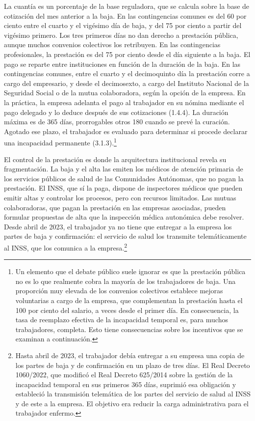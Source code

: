 \documentclass[10pt,a4paper]{article}
\begin{document}
La cuantía es un porcentaje de la base reguladora, que se calcula sobre la base de cotización del mes anterior a la baja. En las contingencias comunes es del 60 por ciento entre el cuarto y el vigésimo día de baja, y del 75 por ciento a partir del vigésimo primero. Los tres primeros días no dan derecho a prestación pública, aunque muchos convenios colectivos los retribuyen. En las contingencias profesionales, la prestación es del 75 por ciento desde el día siguiente a la baja. El pago se reparte entre instituciones en función de la duración de la baja. En las contingencias comunes, entre el cuarto y el decimoquinto día la prestación corre a cargo del empresario, y desde el decimosexto, a cargo del Instituto Nacional de la Seguridad Social o de la mutua colaboradora, según la opción de la empresa. En la práctica, la empresa adelanta el pago al trabajador en su nómina mediante el pago delegado y lo deduce después de sus cotizaciones (1.4.4). La duración máxima es de 365 días, prorrogables otros 180 cuando se prevé la curación. Agotado ese plazo, el trabajador es evaluado para determinar si procede declarar una incapacidad permanente (3.1.3).\footnote{Un elemento que el debate público suele ignorar es que la prestación pública no es lo que realmente cobra la mayoría de los trabajadores de baja. Una proporción muy elevada de los convenios colectivos establece mejoras voluntarias a cargo de la empresa, que complementan la prestación hasta el 100 por ciento del salario, a veces desde el primer día. En consecuencia, la tasa de reemplazo efectiva de la incapacidad temporal es, para muchos trabajadores, completa. Esto tiene consecuencias sobre los incentivos que se examinan a continuación.
}

El control de la prestación es donde la arquitectura institucional revela su fragmentación. La baja y el alta las emiten los médicos de atención primaria de los servicios públicos de salud de las Comunidades Autónomas, que no pagan la prestación. El INSS, que sí la paga, dispone de inspectores médicos que pueden emitir altas y controlar los procesos, pero con recursos limitados. Las mutuas colaboradoras, que pagan la prestación en las empresas asociadas, pueden formular propuestas de alta que la inspección médica autonómica debe resolver. Desde abril de 2023, el trabajador ya no tiene que entregar a la empresa los partes de baja y confirmación: el servicio de salud los transmite telemáticamente al INSS, que los comunica a la empresa.\footnote{Hasta abril de 2023, el trabajador debía entregar a su empresa una copia de los partes de baja y de confirmación en un plazo de tres días. El Real Decreto 1060/2022, que modificó el Real Decreto 625/2014 sobre la gestión de la incapacidad temporal en sus primeros 365 días, suprimió esa obligación y estableció la transmisión telemática de los partes del servicio de salud al INSS y de este a la empresa. El objetivo era reducir la carga administrativa para el trabajador enfermo.
}
\end{document}
